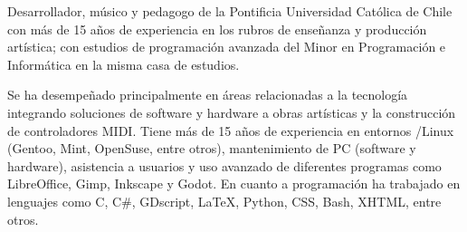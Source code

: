

\begin{cvparagraph}

Desarrollador, músico y pedagogo de la Pontificia Universidad Católica de Chile
con más de 15 años de experiencia en los rubros de enseñanza y producción
artística; con estudios de programación avanzada del Minor en Programación e
Informática en la misma casa de estudios.

Se ha desempeñado principalmente en áreas relacionadas a la tecnología
integrando soluciones de software y hardware a obras artísticas y la
construcción de controladores MIDI. Tiene más de 15 años de experiencia en
entornos /Linux (Gentoo, Mint, OpenSuse, entre otros), mantenimiento
de PC (software y hardware), asistencia a usuarios y uso avanzado de diferentes
programas como LibreOffice, Gimp, Inkscape y Godot. En cuanto a programación ha
trabajado en lenguajes como C, C\#, GDscript, LaTeX, Python, CSS, Bash, XHTML,
entre otros.

\end{cvparagraph}

